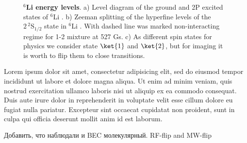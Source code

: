 \begin{figure}
    \caption{\textbf{${}^6$Li energy levels}. a) Level diagram of the ground and 2P excited states of ${}^6$Li \cite{gehm_preparation_2003}. b) Zeeman splitting of the hyperfine levels of the $2\, {}^2\mathrm{S}_{1/2}$ state in ${}^6$Li \cite{serwane_deterministic_2011, sibalic_arc_2017}. With dashed line was marked non-interacting regime for 1-2 mixture at 527 Gs. c) As different spin states for physics we consider state $\ket{1}$ and $\ket{2}$, but for imaging it is worth to flip them to close transitions.}
    \label{fig:li6levels}
\end{figure}

Lorem ipsum dolor sit amet, consectetur adipisicing elit, sed do eiusmod
tempor incididunt ut labore et dolore magna aliqua. Ut enim ad minim veniam,
quis nostrud exercitation ullamco laboris nisi ut aliquip ex ea commodo
consequat. Duis aute irure dolor in reprehenderit in voluptate velit esse
cillum dolore eu fugiat nulla pariatur. Excepteur sint occaecat cupidatat non
proident, sunt in culpa qui officia deserunt mollit anim id est laborum.

Добавить, что наблюдали и BEC молекулярный. RF-flip and MW-flip
